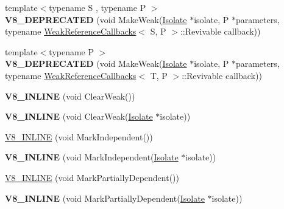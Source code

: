 \begin{DoxyCompactItemize}
\item 
\hypertarget{classv8_1_1_persistent_a80edc93f91f793c7ef40e124a40b7b09}{}{\footnotesize template$<$typename S , typename P $>$ }\\{\bfseries V8\+\_\+\+D\+E\+P\+R\+E\+C\+A\+T\+E\+D} (void Make\+Weak(\hyperlink{classv8_1_1_isolate}{Isolate} $\ast$isolate, P $\ast$parameters, typename \hyperlink{classv8_1_1_weak_reference_callbacks}{Weak\+Reference\+Callbacks}$<$ S, P $>$\+::Revivable callback))\label{classv8_1_1_persistent_a80edc93f91f793c7ef40e124a40b7b09}

\item 
\hypertarget{classv8_1_1_persistent_a03ed84a5f98731ab081665d53e46cadf}{}{\footnotesize template$<$typename P $>$ }\\{\bfseries V8\+\_\+\+D\+E\+P\+R\+E\+C\+A\+T\+E\+D} (void Make\+Weak(\hyperlink{classv8_1_1_isolate}{Isolate} $\ast$isolate, P $\ast$parameters, typename \hyperlink{classv8_1_1_weak_reference_callbacks}{Weak\+Reference\+Callbacks}$<$ T, P $>$\+::Revivable callback))\label{classv8_1_1_persistent_a03ed84a5f98731ab081665d53e46cadf}

\item 
\hypertarget{classv8_1_1_persistent_aef009f9e3c6e0ac21cdbad2907686ac3}{}{\bfseries V8\+\_\+\+I\+N\+L\+I\+N\+E} (void Clear\+Weak())\label{classv8_1_1_persistent_aef009f9e3c6e0ac21cdbad2907686ac3}

\item 
\hypertarget{classv8_1_1_persistent_a500449e9aaa394cd9df95c698a487ac9}{}{\bfseries V8\+\_\+\+I\+N\+L\+I\+N\+E} (void Clear\+Weak(\hyperlink{classv8_1_1_isolate}{Isolate} $\ast$isolate))\label{classv8_1_1_persistent_a500449e9aaa394cd9df95c698a487ac9}

\item 
\hyperlink{classv8_1_1_persistent_aa8497281225e9678f03b6997ae559960}{V8\+\_\+\+I\+N\+L\+I\+N\+E} (void Mark\+Independent())
\item 
\hypertarget{classv8_1_1_persistent_a2b4071c032c97886ba1bcb0ebacb2209}{}{\bfseries V8\+\_\+\+I\+N\+L\+I\+N\+E} (void Mark\+Independent(\hyperlink{classv8_1_1_isolate}{Isolate} $\ast$isolate))\label{classv8_1_1_persistent_a2b4071c032c97886ba1bcb0ebacb2209}

\item 
\hyperlink{classv8_1_1_persistent_ab096f22fc5023ba07631537633b42565}{V8\+\_\+\+I\+N\+L\+I\+N\+E} (void Mark\+Partially\+Dependent())
\item 
\hypertarget{classv8_1_1_persistent_a89a708d5a98331a2683324be9dc5a474}{}{\bfseries V8\+\_\+\+I\+N\+L\+I\+N\+E} (void Mark\+Partially\+Dependent(\hyperlink{classv8_1_1_isolate}{Isolate} $\ast$isolate))\label{classv8_1_1_persistent_a89a708d5a98331a2683324be9dc5a474}


\end{DoxyCompactItemize}
